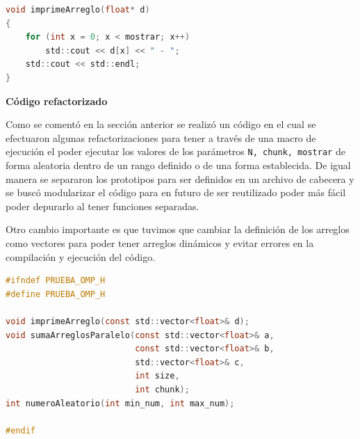 \documentclass[12pt,a4paper]{article}
\begin{document}
\begin{lstlisting}[language=C, numbers=none]
void imprimeArreglo(float* d)
{
    for (int x = 0; x < mostrar; x++)
        std::cout << d[x] << " - ";
    std::cout << std::endl;
}
\end{lstlisting}

\vspace{1em}

\textbf{Código refactorizado}

\vspace{1em}

Como se comentó en la sección anterior se realizó un código en el cual se efectuaron algunas refactorizaciones para tener a través de una macro de ejecución el poder ejecutar los valores de los parámetros \texttt{N, chunk, mostrar}  de forma aleatoria dentro de un rango definido o de una forma establecida. De igual manera se separaron los prototipos para ser definidos en un archivo de cabecera y se buscó modularizar el código para en futuro de ser reutilizado poder más fácil poder depurarlo al tener funciones separadas.

Otro cambio importante es que tuvimos que cambiar la definición de los arreglos como vectores para poder tener arreglos dinámicos y evitar errores en la compilación y ejecución del código.

\vspace{1em}
 
\begin{lstlisting}[language=C, numbers=none]
#ifndef PRUEBA_OMP_H
#define PRUEBA_OMP_H

void imprimeArreglo(const std::vector<float>& d);
void sumaArreglosParalelo(const std::vector<float>& a, 
                          const std::vector<float>& b, 
                          std::vector<float>& c, 
                          int size,
                          int chunk);
int numeroAleatorio(int min_num, int max_num);

#endif
\end{lstlisting}
\end{document}
